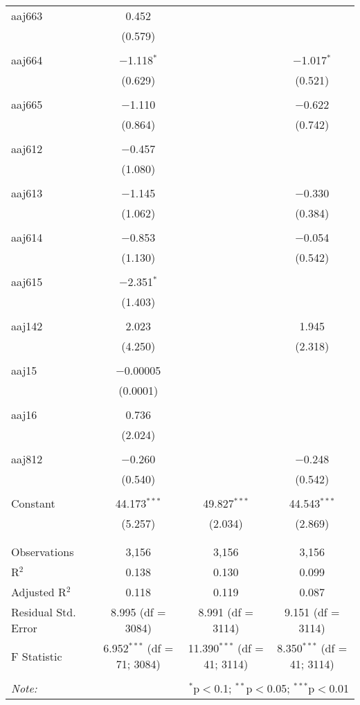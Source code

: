 \begin{table}[!htbp]
\begin{tabular}{@{\extracolsep{5pt}}lccc}
 aaj663 & 0.452 &  &  \\ 
  & (0.579) &  &  \\ 
  & & & \\ 
 aaj664 & $-$1.118$^{*}$ &  & $-$1.017$^{*}$ \\ 
  & (0.629) &  & (0.521) \\ 
  & & & \\ 
 aaj665 & $-$1.110 &  & $-$0.622 \\ 
  & (0.864) &  & (0.742) \\ 
  & & & \\ 
 aaj612 & $-$0.457 &  &  \\ 
  & (1.080) &  &  \\ 
  & & & \\ 
 aaj613 & $-$1.145 &  & $-$0.330 \\ 
  & (1.062) &  & (0.384) \\ 
  & & & \\ 
 aaj614 & $-$0.853 &  & $-$0.054 \\ 
  & (1.130) &  & (0.542) \\ 
  & & & \\ 
 aaj615 & $-$2.351$^{*}$ &  &  \\ 
  & (1.403) &  &  \\ 
  & & & \\ 
 aaj142 & 2.023 &  & 1.945 \\ 
  & (4.250) &  & (2.318) \\ 
  & & & \\ 
 aaj15 & $-$0.00005 &  &  \\ 
  & (0.0001) &  &  \\ 
  & & & \\ 
 aaj16 & 0.736 &  &  \\ 
  & (2.024) &  &  \\ 
  & & & \\ 
 aaj812 & $-$0.260 &  & $-$0.248 \\ 
  & (0.540) &  & (0.542) \\ 
  & & & \\ 
 Constant & 44.173$^{***}$ & 49.827$^{***}$ & 44.543$^{***}$ \\ 
  & (5.257) & (2.034) & (2.869) \\ 
  & & & \\ 
\hline \\[-1.8ex] 
Observations & 3,156 & 3,156 & 3,156 \\ 
R$^{2}$ & 0.138 & 0.130 & 0.099 \\ 
Adjusted R$^{2}$ & 0.118 & 0.119 & 0.087 \\ 
Residual Std. Error & 8.995 (df = 3084) & 8.991 (df = 3114) & 9.151 (df = 3114) \\ 
F Statistic & 6.952$^{***}$ (df = 71; 3084) & 11.390$^{***}$ (df = 41; 3114) & 8.350$^{***}$ (df = 41; 3114) \\ 
\hline 
\hline \\[-1.8ex] 
\textit{Note:}  & \multicolumn{3}{r}{$^{*}$p$<$0.1; $^{**}$p$<$0.05; $^{***}$p$<$0.01} \\ 
\end{tabular} 
\end{table} 
